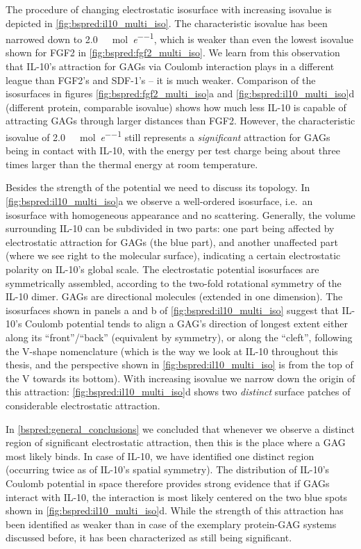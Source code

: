 The procedure of changing electrostatic isosurface with increasing isovalue is
depicted in \cref{fig:bspred:il10_multi_iso}. The characteristic isovalue has
been narrowed down to \SI{2.0}{\kilo\calory\per\mole\per\elementarycharge},
which is weaker than even the lowest isovalue shown for FGF2 in
\cref{fig:bspred:fgf2_multi_iso}. We learn from this observation that IL-10's
attraction for GAGs via Coulomb interaction plays in a different league than
FGF2's and SDF-1's -- it is much weaker. Comparison of the isosurfaces in
figures \ref{fig:bspred:fgf2_multi_iso}a and \ref{fig:bspred:il10_multi_iso}d
(different protein, comparable isovalue) shows how much less IL-10 is capable of
attracting GAGs through larger distances than FGF2. However, the characteristic
isovalue of \SI{2.0}{\kilo\calory\per\mole\per\elementarycharge} still
represents a \textit{significant} attraction for GAGs being in contact with
IL-10, with the energy per test charge being about three times larger than the
thermal energy at room temperature.

Besides the strength of the potential we need to discuss its topology. In
\cref{fig:bspred:il10_multi_iso}a we observe a well-ordered isosurface, i.e.\ an
isosurface with homogeneous appearance and no scattering. Generally, the volume
surrounding IL-10 can be subdivided in two parts: one part being affected by
electrostatic attraction for GAGs (the blue part), and another unaffected part
(where we see right to the molecular surface), indicating a certain
electrostatic polarity on IL-10's global scale. The electrostatic potential
isosurfaces are symmetrically assembled, according to the two-fold rotational
symmetry of the IL-10 dimer. GAGs are directional molecules (extended in one
dimension). The isosurfaces shown in panels a and b of
\cref{fig:bspred:il10_multi_iso} suggest that IL-10's Coulomb potential tends to
align a GAG's direction of longest extent either along its
\enquote{front}/\enquote{back} (equivalent by symmetry), or along the
\enquote{cleft}, following the V-shape nomenclature (which is the way we look at
IL-10 throughout this thesis, and the perspective shown in
\cref{fig:bspred:il10_multi_iso} is from the top of the V towards its bottom).
With increasing isovalue we narrow down the origin of this attraction:
\cref{fig:bspred:il10_multi_iso}d shows two \textit{distinct} surface patches of
considerable electrostatic attraction.

In \cref{bspred:general_conclusions} we concluded that whenever we observe a
distinct region of significant electrostatic attraction, then this is the place
where a GAG most likely binds. In case of IL-10, we have identified one distinct
region (occurring twice as of IL-10's spatial symmetry). The distribution of
IL-10's Coulomb potential in space therefore provides strong evidence that if
GAGs interact with IL-10, the interaction is most likely centered on the two
blue spots shown in \cref{fig:bspred:il10_multi_iso}d. While the strength of
this attraction has been identified as weaker than in case of the exemplary
protein-GAG systems discussed before, it has been characterized as still being
significant.


